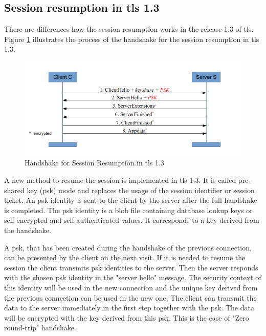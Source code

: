 \subsection{Session resumption in \gls{tls} 1.3}
\label{subsec:resumption1_3}

There are differences how the session resumption works in the release 1.3 of \gls{tls}. Figure \ref{fig:resumption1_3} illustrates the process of the handshake for the session resumption in \gls{tls} 1.3.

\begin{figure}[H]
	\centering
		\includegraphics[scale=0.8]{images/resumption1_3.png}
	\caption{Handshake for Session Resumption in \gls{tls} 1.3 \cite{Hassenstein}}
	\label{fig:resumption1_3}
\end{figure}

A new method to resume the session is implemented in \gls{tls} 1.3. It is called pre-shared key (\gls{psk}) mode and replaces the usage of the session identifier or session ticket. An \gls{psk} identity is sent to the client by the server after the full handshake is completed. The \gls{psk} identity is a blob file containing database lookup keys or self-encrypted and self-authenticated values. It corresponds to a key derived from the handshake.

A \gls{psk}, that has been created during the handshake of the previous connection, can be presented by the client on the next visit. If it is needed to resume the session the client transmits \gls{psk} identities to the server. Then the server responds with the chosen \gls{psk} identity in the "server hello" message. The security context of this identity will be used in the new connection and the unique key derived from the previous connection can be used in the new one. 
The client can transmit the data to the server immediately in the first step together with the \gls{psk}. The data will be encrypted with the key derived from this \gls{psk}. \cite{ldapwiki:resumption} This is the case of "Zero round-trip" handshake.

